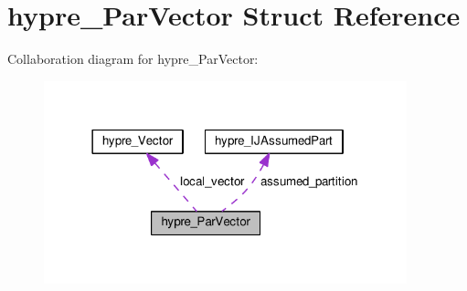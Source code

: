 \hypertarget{structhypre__ParVector}{}\section{hypre\+\_\+\+Par\+Vector Struct Reference}
\label{structhypre__ParVector}


Collaboration diagram for hypre\+\_\+\+Par\+Vector\+:
\nopagebreak
\begin{figure}[H]
\begin{center}
\leavevmode
\includegraphics[width=298pt]{structhypre__ParVector__coll__graph}
\end{center}
\end{figure}

